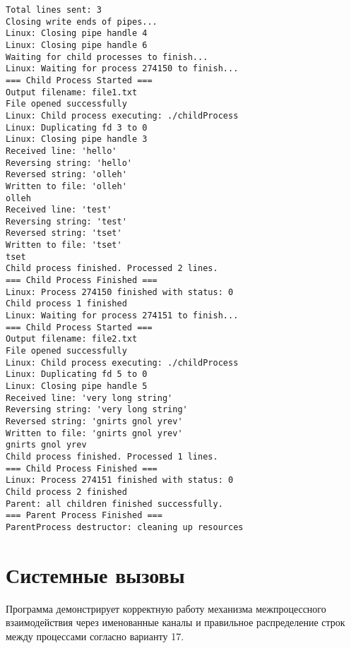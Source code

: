 \begin{lstlisting}[caption={Логи выполнения программы}]
Total lines sent: 3
Closing write ends of pipes...
Linux: Closing pipe handle 4
Linux: Closing pipe handle 6
Waiting for child processes to finish...
Linux: Waiting for process 274150 to finish...
=== Child Process Started ===
Output filename: file1.txt
File opened successfully
Linux: Child process executing: ./childProcess
Linux: Duplicating fd 3 to 0
Linux: Closing pipe handle 3
Received line: 'hello'
Reversing string: 'hello'
Reversed string: 'olleh'
Written to file: 'olleh'
olleh
Received line: 'test'
Reversing string: 'test'
Reversed string: 'tset'
Written to file: 'tset'
tset
Child process finished. Processed 2 lines.
=== Child Process Finished ===
Linux: Process 274150 finished with status: 0
Child process 1 finished
Linux: Waiting for process 274151 to finish...
=== Child Process Started ===
Output filename: file2.txt
File opened successfully
Linux: Child process executing: ./childProcess
Linux: Duplicating fd 5 to 0
Linux: Closing pipe handle 5
Received line: 'very long string'
Reversing string: 'very long string'
Reversed string: 'gnirts gnol yrev'
Written to file: 'gnirts gnol yrev'
gnirts gnol yrev
Child process finished. Processed 1 lines.
=== Child Process Finished ===
Linux: Process 274151 finished with status: 0
Child process 2 finished
Parent: all children finished successfully.
=== Parent Process Finished ===
ParentProcess destructor: cleaning up resources
\end{lstlisting}

\section{Системные вызовы}





Программа демонстрирует корректную работу механизма межпроцессного взаимодействия через именованные каналы и правильное распределение строк между процессами согласно варианту 17.